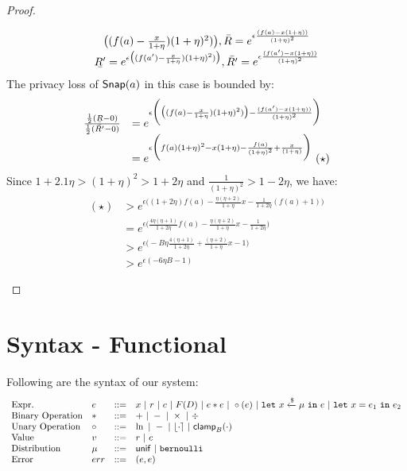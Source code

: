 \documentclass[a4paper,11pt]{article}
\begin{document}
\begin{proof}
\begin{itemize}
\[\begin{array}{c}
{		\big( (f(a) -  \frac{x}{1 + \eta}) (1 + \eta)^2) \big)},
		\bar{R} = e^{\epsilon 
		\frac{(f(a) - x(1 + \eta))}{(1 + \eta)^2}}
		\\
		\ubar{R'} = e^{\epsilon 
		\big( (f(a') -  \frac{x}{1 + \eta}) (1 + \eta)^2) \big)},
		\bar{R'} = e^{\epsilon 
		\frac{(f(a') - x(1 + \eta))}{(1 + \eta)^2}}
		\end{array}
		\]
		The privacy loss of $\mathsf{Snap}(a)$ in this case is bounded by:
		\[
		\begin{array}{ll}
		\frac
		{\frac{1}{2}(\ubar{R} - 0)}
		{\frac{1}{2}(\bar{R'} - 0)}
		& = e^{\epsilon
		\bigg(
		\big( (f(a) -  \frac{x}{1 + \eta}) (1 + \eta)^2) \big)
		-
		\frac{(f(a') - x(1 + \eta))}{(1 + \eta)^2}
		\bigg)}\\
		& = e^{\epsilon
		\bigg(
		f(a)(1 + \eta)^2 - x(1 + \eta) 
		- \frac{f(a)}{(1 + \eta)^2} + \frac{x}{(1 + \eta)}   
		\bigg)} ~ (\star)
		\end{array}
		\]
		Since $ 1 + 2.1\eta > (1 + \eta)^2 > 1 + 2\eta$ and $\frac{1}{(1 + \eta)^2} > 1 - 2 \eta$, we have:
		\[
		\begin{array}{ll}
		(\star) & > e^{\epsilon \big(
		(1 + 2\eta) f(a) - \frac{\eta(\eta + 2)}{1 + \eta} x
		- \frac{1}{1 + 2\eta}(f(a) + 1)
		\big)}\\
		& = e^{\epsilon\big(
		\frac{4\eta(\eta + 1)}{1 + 2\eta} f(a) 
		- \frac{\eta(\eta + 2)}{1 + \eta} x
		- \frac{1}{1 + 2\eta}		
		\big)}\\
		& > e^{\epsilon\big( -B \eta
		\frac{4(\eta + 1)}{1 + 2\eta} + \frac{(\eta + 2)}{1 + \eta} x - 1	
		\big)}\\
%
		& > e^{\epsilon(-6 \eta B - 1)}
		\end{array}
		\]
	\end{itemize}



\end{proof}

\newpage
\section{Syntax - Functional}
Following are the syntax of our system:
%
\[\begin{array}{llll}
\mbox{Expr.} & \expr & ::= & \varx 
	~|~ \rval ~|~ \fval
	~|~ F(\data) ~|~ \expr \bop \expr
	~|~ \uop (\expr) ~|~ \elet ~ \varx \samplel \edistr ~ \ein ~ \expr
	~|~ \elet ~ \varx = \expr_1 ~ \ein ~ \expr_2 \\
%
\mbox{Binary Operation} & \bop & ::= & + ~|~ - ~|~ \times ~|~ \div \\
%
\mbox{Unary Operation} & \uop & ::= & \ln ~|~ - ~|~ \round{\cdot} 
	~|~ \clamp_B(\cdot) \\
%
\mbox{Value} & \valv & ::= & \rval ~|~  \fval \\
%
\mbox{Distribution} & \edistr & ::= & \uniform ~|~ \bernoulli \\ 
%
\mbox{Error} & \err & ::= & (\expr, \expr)
%
\end{array}
\]
\end{document}

